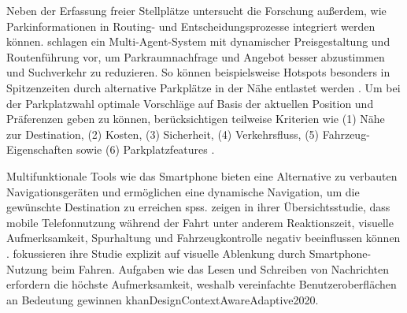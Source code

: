 

Neben der Erfassung freier Stellplätze untersucht die Forschung außerdem, wie Parkinformationen in Routing- und Entscheidungsprozesse integriert werden können. \citet{hassineDynamicPricingRoute2024} schlagen ein Multi-Agent-System mit dynamischer Preisgestaltung und Routenführung vor, um Parkraumnachfrage und Angebot besser abzustimmen und Suchverkehr zu reduzieren. So können beispielsweise Hotspots besonders in Spitzenzeiten durch alternative Parkplätze in der Nähe entlastet werden \citep{hassineDynamicPricingRoute2024}. Um bei der Parkplatzwahl optimale Vorschläge auf Basis der aktuellen Position und Präferenzen geben zu können, berücksichtigen \citet{icarte-ahamudaMultiAgentSystemParking2025} teilweise Kriterien wie
(1) Nähe zur Destination, 
(2) Kosten, 
(3) Sicherheit, 
(4) Verkehrsfluss, 
(5) Fahrzeug-Eigenschaften sowie
(6) Parkplatzfeatures \citep{icarte-ahumadaMultiAgentSystemParking2025}. 





Multifunktionale Tools wie das Smartphone bieten eine Alternative zu verbauten Navigationsgeräten und ermöglichen eine dynamische Navigation, um die gewünschte Destination zu erreichen \acp{sps}. \citet{oviedo-trespalaciosUnderstandingImpactsMobile2016} zeigen in ihrer Übersichtsstudie, dass mobile Telefonnutzung während der Fahrt unter anderem Reaktionszeit, visuelle Aufmerksamkeit, Spurhaltung und Fahrzeugkontrolle negativ beeinflussen können \citep{oviedo-trespalaciosUnderstandingImpactsMobile2016}. \citet{fancelloAnalysisVisualDistraction2025} fokussieren ihre Studie explizit auf visuelle Ablenkung durch Smartphone-Nutzung beim Fahren. Aufgaben wie das Lesen und Schreiben von Nachrichten erfordern die höchste Aufmerksamkeit, weshalb vereinfachte Benutzeroberflächen an Bedeutung gewinnen \citep{fancelloAnalysisVisualDistraction2025}{khanDesignContextAwareAdaptive2020}.


